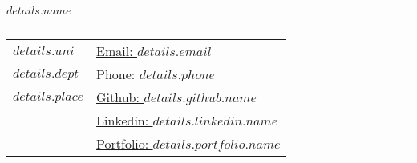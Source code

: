 \documentclass[letterpaper,11pt,oneside]{article}
\begin{document}
\noindent  \LARGE{\textbf{$details.name$}} \\
\vspace{-2ex} 
\hrule 
\normalsize

\begin{center}
\begin{tabular}{l l}
  $details.uni$   & \hspace{0.95in} \href{mailto:$details.email$}{Email: $details.email$} \\
  $details.dept$  & \hspace{1in}Phone: $details.phone$ \\
  $details.place$ & \hspace{1in} \href{$details.github.url$}{Github: $details.github.name$} \\
  & \hspace{1in} \href{$details.linkedin.url$}{Linkedin: $details.linkedin.name$} \\
  & \hspace{1in} \href{$details.portfolio.url$}{Portfolio: $details.portfolio.name$}
\end{tabular}
\end{center}

\vspace{1em}

\end{document}
